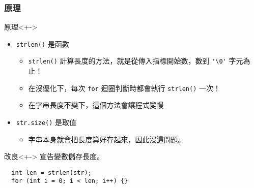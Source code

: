 \documentclass[utf8]{beamer}
\begin{document}
\begin{CJK}{UTF8}{bkai}
\begin{frame}[fragile]
  \frametitle{原理}
  \begin{exampleblock}{原理}<+->
    \begin{itemize}[<+->]
    \item \lstinline{strlen()}{} 是\alert{函數}
      \begin{itemize}
      \item \lstinline{strlen()}{} 計算長度的方法，就是從傳入指標開始數，數到 \lstinline{'\0'}{} 字元為止！
      \item 在沒優化下，每次 \lstinline{for}{} 迴圈判斷時都會執行 \lstinline{strlen()}{} 一次！
      \item 在字串長度不變下，這個方法會讓程式變慢
      \end{itemize}
    \item \lstinline{str.size()}{} 是\alert{取值}
      \begin{itemize}
      \item 字串本身就會把長度算好存起來，因此沒這問題。
      \end{itemize}
    \end{itemize}
  \end{exampleblock}
  \begin{alertblock}{改良}<+->
  宣告變數儲存長度。
  \onslide<+->
  \begin{lstlisting}
  int len = strlen(str);
  for (int i = 0; i < len; i++) {}
  \end{lstlisting}
  \end{alertblock}
\end{frame}


\end{CJK}
\end{document}
